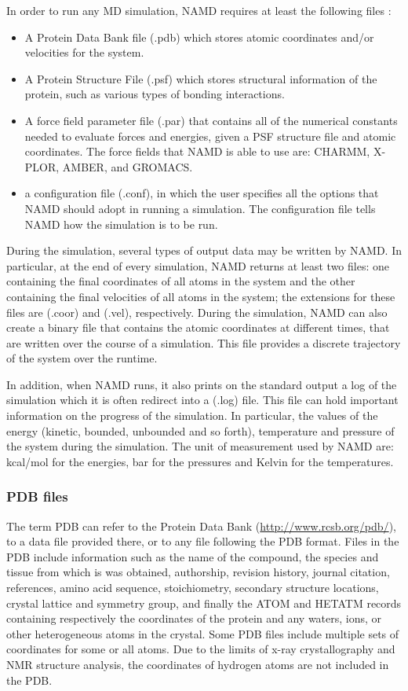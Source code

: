 In order to run any MD simulation, NAMD requires at least the following files \cite{ref:NAMD-VMD_Kukol}:
\begin{itemize}
\item A Protein Data Bank file (.pdb) which stores atomic coordinates and/or velocities for the system.
\item A Protein Structure File (.psf) which stores structural information of the protein, such as various types of bonding interactions.
\item A force field parameter file (.par) that contains all of the numerical constants needed to evaluate forces and energies, given a PSF structure file and atomic coordinates. The force fields that NAMD is able to use are: CHARMM, X-PLOR, AMBER, and GROMACS. 
\item a configuration file (.conf), in which the user specifies all the options that NAMD should adopt in running a simulation. The configuration file tells NAMD how the simulation is to be run.
\end{itemize}
During the simulation, several types of output data may be written by NAMD. In particular, at the end of every simulation, NAMD returns at least two files: 
one containing the final coordinates of all atoms in the system and the other containing the final velocities of all atoms in the system; 
the extensions for these files are (.coor) and (.vel), respectively. During the simulation, NAMD can also create a binary file that contains the atomic coordinates at different times, that are written over the course of a simulation. This file provides a discrete trajectory of the system over the runtime. 

In addition, when NAMD runs, it also prints on the standard output a log of the simulation which it is often redirect into a (.log) file. This file can hold important information on the progress of the simulation. In particular, the values of the energy (kinetic, bounded, unbounded and so forth), temperature and pressure of the system during the simulation. The unit of measurement used by NAMD are: kcal/mol for the energies, bar for the pressures and Kelvin for the temperatures.

\subsubsection{PDB files}
The term PDB can refer to the Protein Data Bank (\url{http://www.rcsb.org/pdb/}), to a data file provided there, or to any file following the PDB format. Files in the PDB include information such as the name of the compound, the species and tissue from which is was obtained, authorship, revision history, journal citation, references, amino acid sequence, stoichiometry, secondary structure locations, crystal lattice and symmetry group, and finally the ATOM and HETATM records containing respectively the coordinates of the protein and any waters, ions, or other heterogeneous atoms in the crystal. Some PDB files include multiple sets of coordinates for some or all atoms. Due to the limits of x-ray crystallography and NMR structure analysis, the coordinates of hydrogen atoms are not included in the PDB.

